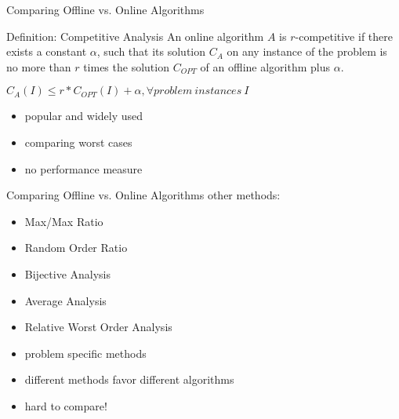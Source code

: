 \begin{frame}{Comparing Offline vs. Online Algorithms}
  \begin{block}{Definition: Competitive Analysis}
    An online algorithm $A$ is \alert{$r$-competitive} if there exists a constant $\alpha$, such that its solution $C_A$ on any instance of the problem is no more than $r$ times the solution $C_{OPT}$ of an offline algorithm plus $\alpha$. \\
    
    \vspace{5pt}
    
    \begin{center}
      $C_A(I) \le r * C_{OPT}(I) + \alpha, \forall problem\ instances\ I$
    \end{center}

    \vspace{5pt}
  \end{block}

  \begin{itemize}
    \item<2-> popular and widely used
    \item<3-> comparing worst cases
    \item<4-> no performance measure
  \end{itemize}
\end{frame}

\begin{frame}{Comparing Offline vs. Online Algorithms}
  other methods:
  \begin{itemize}
    \item Max/Max Ratio
    \item Random Order Ratio
    \item Bijective Analysis
    \item Average Analysis
    \item Relative Worst Order Analysis
    \item problem specific methods
  \end{itemize}

  \vspace{10pt}

  \begin{itemize}
    \item different methods favor different algorithms
    \item hard to compare!
  \end{itemize}
\end{frame}

